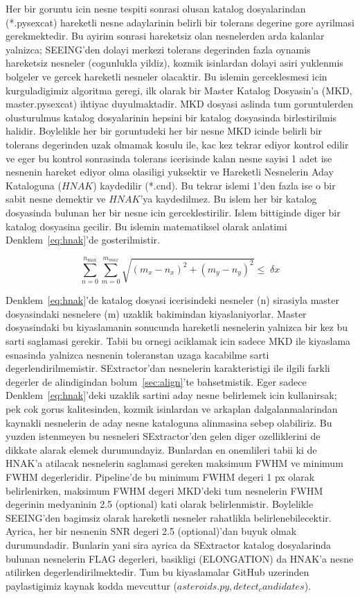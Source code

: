 \documentclass[review]{elsarticle}
\begin{document}
Her bir goruntu icin nesne tespiti sonrasi olusan katalog dosyalarindan (*.pysexcat) hareketli nesne adaylarinin belirli bir tolerans degerine gore ayrilmasi gerekmektedir. Bu ayirim sonrasi hareketsiz olan nesnelerden arda kalanlar yalnizca; SEEING’den dolayi merkezi tolerans degerinden fazla oynamis hareketsiz nesneler (cogunlukla yildiz), kozmik isinlardan dolayi asiri yuklenmis bolgeler ve gercek hareketli nesneler olacaktir. Bu islemin gerceklesmesi icin kurguladigimiz algoritma geregi, ilk olarak bir Master Katalog Dosyasin’a (MKD, master.pysexcat) ihtiyac duyulmaktadir. MKD dosyasi aslinda tum goruntulerden olusturulmus katalog dosyalarinin hepsini bir katalog dosyasinda birlestirilmis halidir. Boylelikle her bir goruntudeki her bir nesne MKD icinde belirli bir tolerans degerinden uzak olmamak kosulu ile, kac kez tekrar ediyor kontrol edilir ve eger bu kontrol sonrasinda tolerans icerisinde kalan nesne sayisi 1 adet ise nesnenin hareket ediyor olma olasiligi yuksektir ve Hareketli Nesnelerin Aday Kataloguna  ($HNAK$) kaydedilir (*.cnd). Bu tekrar islemi 1’den fazla ise o bir sabit nesne demektir ve $HNAK$’ya kaydedilmez. Bu islem her bir katalog dosyasinda bulunan her bir nesne icin gerceklestirilir. Islem bittiginde diger bir katalog dosyasina gecilir. Bu islemin matematiksel olarak anlatimi Denklem~\ref{eq:hnak}’de gosterilmistir.

\begin{equation} \label{eq:hnak}
\sum_{n=0}^{n_{\max }}{\sum_{m=0}^{m_{max}}{\sqrt{\left( m_{x}-n_{x} \right)^{2}+\left( m_{y}-n_{y} \right)^{2}}}\leq \; \delta{x}} 
\end{equation}

Denklem~\ref{eq:hnak}’de katalog dosyasi icerisindeki nesneler (n) sirasiyla master dosyasindaki nesnelere (m) uzaklik bakimindan kiyaslaniyorlar. Master dosyasindaki bu kiyaslamanin sonucunda hareketli nesnelerin yalnizca bir kez bu sarti saglamasi gerekir. Tabii bu ornegi aciklamak icin sadece MKD ile kiyaslama esnasinda yalnizca nesnenin toleranstan uzaga kacabilme sarti degerlendirilmemistir. SExtractor'dan nesnelerin karakteristigi ile ilgili farkli degerler de alindigindan bolum~\ref{sec:align}'te bahsetmistik. Eger sadece Denklem~\ref{eq:hnak}'deki uzaklik sartini aday nesne belirlemek icin kullanirsak; pek cok gorus kalitesinden, kozmik isinlardan ve arkaplan dalgalanmalarindan kaynakli nesnelerin de aday nesne kataloguna alinmasina sebep olabiliriz. Bu yuzden istenmeyen bu nesneleri SExtractor'den gelen diger ozelliklerini de dikkate alarak elemek durumundayiz. Bunlardan en onemlileri tabii ki de HNAK'a atilacak nesnelerin saglamasi gereken maksimum FWHM ve minimum FWHM degerleridir. Pipeline'de bu minimum FWHM degeri 1 px olarak belirlenirken,  maksimum FWHM degeri MKD'deki tum nesnelerin FWHM degerinin  medyaninin 2.5 (optional) kati olarak belirlenmistir. Boylelikle SEEING'den bagimsiz olarak hareketli nesneler rahatlikla belirlenebilecektir. Ayrica, her bir nesnenin SNR degeri 2.5 (optional)'dan buyuk olmak durumundadir. Bunlarin yani sira ayrica da SExtractor katalog dosyalarinda bulunan nesnelerin FLAG degerleri, basikligi (ELONGATION) da HNAK'a nesne atilirken degerlendirilmektedir. Tum bu kiyaslamalar GitHub uzerinden paylastigimiz kaynak kodda mevcuttur ($asteroids.py, detect_candidates$).
\end{document}
